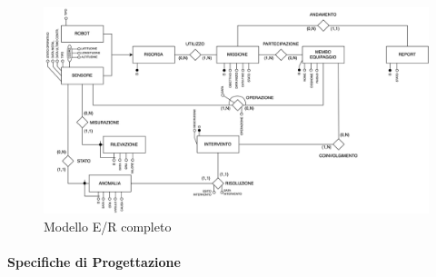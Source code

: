 \begin{figure}[h!]
    \centering
    \includegraphics[width=\textwidth]{Media/ER_Completo.png}
    \caption{Modello E/R completo}
    \label{fig:schema_portante}
\end{figure}

\paragraph{Specifiche di Progettazione}

